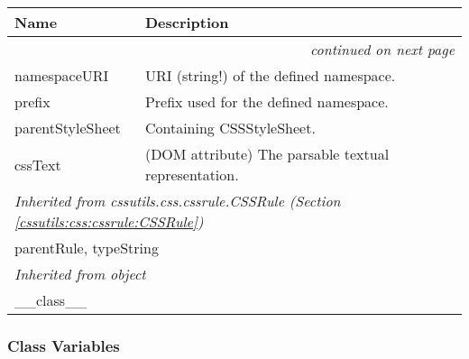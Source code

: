     \vspace{-1cm}
\hspace{\varindent}\begin{longtable}{|p{\varnamewidth}|p{\vardescrwidth}|l}
\cline{1-2}
\cline{1-2} \centering \textbf{Name} & \centering \textbf{Description}& \\
\cline{1-2}
\endhead\cline{1-2}\multicolumn{3}{r}{\small\textit{continued on next page}}\\\endfoot\cline{1-2}
\endlastfoot\raggedright n\-a\-m\-e\-s\-p\-a\-c\-e\-U\-R\-I\- & \raggedright URI (string!) of the defined namespace.&\\
\cline{1-2}
\raggedright p\-r\-e\-f\-i\-x\- & \raggedright Prefix used for the defined namespace.&\\
\cline{1-2}
\raggedright p\-a\-r\-e\-n\-t\-S\-t\-y\-l\-e\-S\-h\-e\-e\-t\- & \raggedright Containing CSSStyleSheet.&\\
\cline{1-2}
\raggedright c\-s\-s\-T\-e\-x\-t\- & \raggedright (DOM attribute) The parsable textual representation.&\\
\cline{1-2}
\multicolumn{2}{|l|}{\textit{Inherited from cssutils.css.cssrule.CSSRule \textit{(Section \ref{cssutils:css:cssrule:CSSRule})}}}\\
\multicolumn{2}{|p{\varwidth}|}{\raggedright parentRule, typeString}\\
\cline{1-2}
\multicolumn{2}{|l|}{\textit{Inherited from object}}\\
\multicolumn{2}{|p{\varwidth}|}{\raggedright \_\_class\_\_}\\
\cline{1-2}
\end{longtable}



  \subsubsection{Class Variables}

